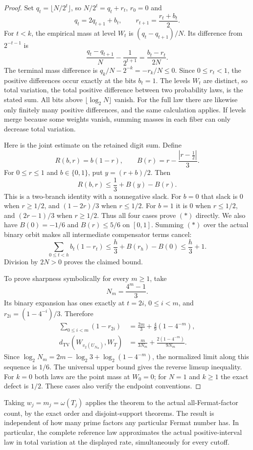 \documentclass[11pt]{article}
\theoremstyle{definition}
\begin{document}
\begin{proof}
Set $q_t=\lfloor N/2^t\rfloor$, so $N/2^t=q_t+r_t$,
$r_0=0$ and
\[
 q_t=2q_{t+1}+b_t,\qquad
 r_{t+1}=\frac{r_t+b_t}{2}.
\]
For $t<k$, the empirical mass at level $W_t$ is
$(q_t-q_{t+1})/N$.  Its difference from $2^{-t-1}$ is
\[
 \frac{q_t-q_{t+1}}N-\frac1{2^{t+1}}
   =\frac{b_t-r_t}{2N}.
\]
The terminal mass difference is
$q_k/N-2^{-k}=-r_k/N\le0$.
Since $0\le r_t<1$, the positive differences occur exactly at
the bits $b_t=1$.  The levels $W_t$ are distinct, so total variation,
the total positive difference between two probability laws,
is the stated sum.  All bits above $\lfloor\log_2N\rfloor$ vanish.
For the full law there are likewise only finitely many positive
differences, and the same calculation applies.  If levels merge
because some weights vanish, summing masses in each fiber can
only decrease total variation.

Here is the joint estimate on the retained digit sum.  Define
\[
 R(b,r)=b(1-r),\qquad B(r)=r-\frac{|r-\tfrac12|}{3}.
\]
For $0\le r\le1$ and $b\in\{0,1\}$, put $y=(r+b)/2$.
Then
\[
 R(b,r)\le \frac13+B(y)-B(r).
 \tag{*}
\]
This is a two-branch identity with a nonnegative slack.
For $b=0$ that slack is $0$ when $r\ge1/2$, and
$(1-2r)/3$ when $r\le1/2$.  For $b=1$ it is $0$
when $r\le1/2$, and $(2r-1)/3$ when $r\ge1/2$.
Thus all four cases prove $(*)$ directly.
We also have $B(0)=-1/6$ and $B(r)\le5/6$ on $[0,1]$.
Summing $(*)$ over the actual binary orbit makes all intermediate
compensator terms cancel:
\[
 \sum_{0\le t<h}b_t(1-r_t)
 \le \frac h3+B(r_h)-B(0)\le \frac h3+1.
\]
Division by $2N>0$ proves the claimed bound.

To prove sharpness symbolically for every $m\ge1$, take
\[
 N_m=\frac{4^m-1}{3}.
\]
Its binary expansion has ones exactly at $t=2i$,
$0\le i<m$, and
$r_{2i}=(1-4^{-i})/3$.  Therefore
\begin{align*}
 \sum_{0\le i<m}(1-r_{2i})
 &=\frac{2m}{3}+\frac49(1-4^{-m}),\\
 d_{\mathrm{TV}}(W_{v_2(U_{N_m})},W_T)
 &=\frac{m}{3N_m}+\frac{2(1-4^{-m})}{9N_m}.
\end{align*}
Since $\log_2N_m=2m-\log_2 3+\log_2(1-4^{-m})$,
the normalized limit along this sequence is $1/6$.
The universal upper bound gives the reverse limsup inequality.
For $k=0$ both laws are the point mass at $W_0=0$;
for $N=1$ and $k\ge1$ the exact defect is $1/2$.
These cases also verify the endpoint conventions.
\end{proof}

Taking $w_j=m_j=\omega(T_j)$ applies the theorem to the
actual all-Fermat-factor count, by the exact order and disjoint-support
theorems.  The result is independent of how many prime factors
any particular Fermat number has.  In particular, the complete
reference law approximates the actual positive-interval law in total
variation at the displayed rate, simultaneously for every cutoff.
\end{document}
